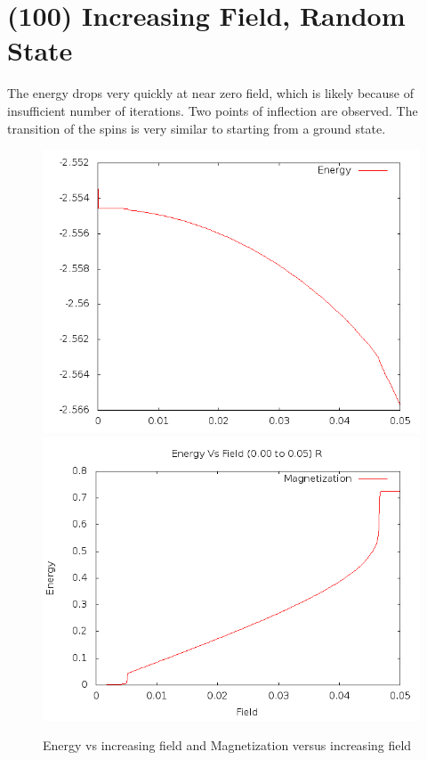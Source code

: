 \documentclass{article}
\begin{document}
\section{(100) Increasing Field, Random State}
The energy drops very quickly at near zero field, which is likely because of insufficient number of iterations. Two
points of inflection are observed. The transition of the spins is very similar to starting from a ground state.
\begin{figure}[h]
 \centering 
\includegraphics[scale=0.3]{100/E000to005R.png}
\includegraphics[scale=0.3]{100/M000to005R.png}
\caption{Energy vs increasing field and Magnetization versus increasing field}
\end{figure}
\end{document}
